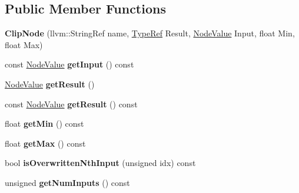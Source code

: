 \subsection*{Public Member Functions}
\begin{DoxyCompactItemize}
\item 
\mbox{\label{classglow_1_1_clip_node_a9a9b362d19a7cdf5beed47b3cb93066b}} 
{\bfseries Clip\+Node} (llvm\+::\+String\+Ref name, \hyperlink{structglow_1_1_type}{Type\+Ref} Result, \hyperlink{structglow_1_1_node_value}{Node\+Value} Input, float Min, float Max)
\item 
\mbox{\label{classglow_1_1_clip_node_a225b780f5ced11468ae855d0b4afa5ec}} 
const \hyperlink{structglow_1_1_node_value}{Node\+Value} {\bfseries get\+Input} () const
\item 
\mbox{\label{classglow_1_1_clip_node_ad55cc62b8adbaafb55e11611aae08515}} 
\hyperlink{structglow_1_1_node_value}{Node\+Value} {\bfseries get\+Result} ()
\item 
\mbox{\label{classglow_1_1_clip_node_ab24ba4a54bb00809afaba4791b155640}} 
const \hyperlink{structglow_1_1_node_value}{Node\+Value} {\bfseries get\+Result} () const
\item 
\mbox{\label{classglow_1_1_clip_node_a597d75486e239fbcc62a60b4735ec5e4}} 
float {\bfseries get\+Min} () const
\item 
\mbox{\label{classglow_1_1_clip_node_af8161dcb3beec88053f805b8b6806a1f}} 
float {\bfseries get\+Max} () const
\item 
\mbox{\label{classglow_1_1_clip_node_af86a7c8f5df6214564dd16167cbc44e2}} 
bool {\bfseries is\+Overwritten\+Nth\+Input} (unsigned idx) const
\item 
\mbox{\label{classglow_1_1_clip_node_a9eebb0903ec13e9c92b5f3634c60fe32}} 
unsigned {\bfseries get\+Num\+Inputs} () const
\item 
\mbox{\label{classglow_1_1_clip_node_a38ff2503d678eff0ccad36c1b62848b7}} 

\end{DoxyCompactItemize}
